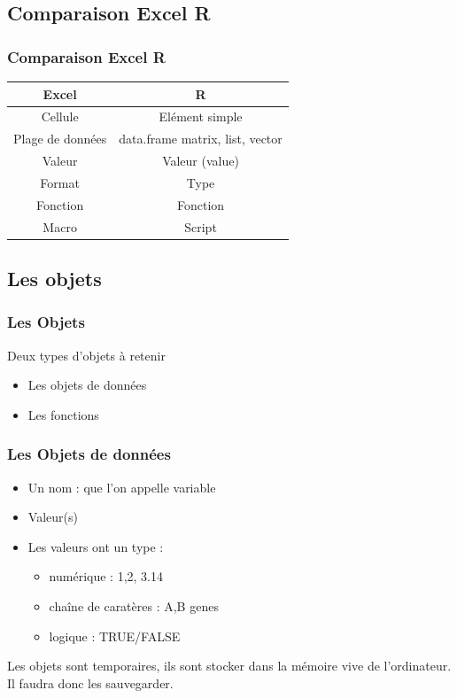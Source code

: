 \documentclass[table,svgnames,hyperref={pdfpagemode=FullScreen}]{beamer}
\begin{document}
\subsection{Comparaison Excel R}
\begin{frame}
	\frametitle{Comparaison Excel R}
	\begin{center}
{
	\begin{tabular}[h]{cc}
		\hline
		\textbf{Excel} &  \textbf{R} \pause\\
		\hline 
		
		Cellule & Elément simple \\
		Plage de données & data.frame matrix, list, vector \pause\\
		\hline
		Valeur & Valeur (value) \\
		Format & Type \pause\\
		\hline
		Fonction & Fonction \\
		Macro & Script \\
		\hline
	\end{tabular}}
	\end{center}
\end{frame}
\subsection{Les objets}
\begin{frame}
	\frametitle{Les Objets}
	\begin{exampleblock}{Deux types d'objets à retenir}
	\begin{itemize}
		\item Les objets de données
		\item Les fonctions
	\end{itemize}
	\end{exampleblock}
\end{frame}
\begin{frame}
	\frametitle{Les Objets de données}
	\begin{itemize}
		\item Un nom : que l'on appelle  variable
		\item Valeur(s)
		\item Les valeurs ont un type : 
			\begin{itemize}
				\item numérique : 1,2, 3.14
				\item chaîne de caratères : A,B genes
				\item logique : TRUE/FALSE
			\end{itemize}
	\end{itemize}
	Les objets sont temporaires, ils sont stocker dans la mémoire vive de l'ordinateur. Il faudra donc les sauvegarder.
\end{frame}
\end{document}
